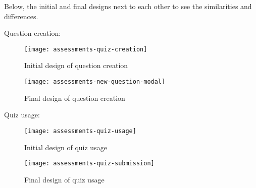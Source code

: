 Below, the initial and final designs next to each other to see the similarities and differences.

Question creation:

\begin{figure}[!hbpt]
	\centering
	\texttt{[image: assessments-quiz-creation]}
	\caption{Initial design of question creation}
\end{figure}

\begin{figure}[!hbpt]
	\centering
	\texttt{[image: assessments-new-question-modal]}
	\caption{Final design of question creation}
\end{figure}


Quiz usage:

\begin{figure}[!hbpt]
	\centering
	\texttt{[image: assessments-quiz-usage]}
	\caption{Initial design of quiz usage}
\end{figure}

\begin{figure}[!hbpt]
	\centering
	\texttt{[image: assessments-quiz-submission]}
	\caption{Final design of quiz usage}
\end{figure}